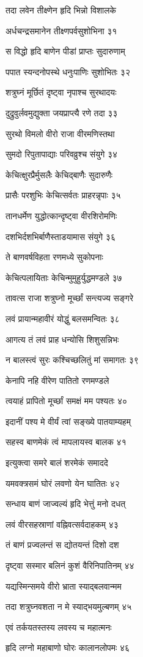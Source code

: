 तदा लवेन तीक्ष्णेन हृदि भिन्नो विशालके

अर्धचन्द्रसमानेन तीक्ष्णपर्वसुशोभिना ३१

स विद्धो हृदि बाणेन पीडां प्राप्तः सुदारुणाम्

पपात स्यन्दनोपस्थे धनुःपाणिः सुशोभितः ३२

शत्रुघ्नं मूर्छितं दृष्ट्वा नृपाश्च सुरथादयः

दुद्रुवुर्लवमुद्युक्ता जयप्राप्त्यै रणे तदा ३३

सुरथो विमलो वीरो राजा वीरमणिस्तथा

सुमदो रिपुतापाद्याः परिवव्रुश्च संयुगे ३४

केचित्क्षुरप्रैर्मुसलैः केचिद्बाणैः सुदारुणैः

प्रासैः परशुभिः केचित्सर्वतः प्राहरन्नृपाः ३५

तानधर्मेण युद्धोत्कान्दृष्ट्वा वीरशिरोमणिः

दशभिर्दशभिर्बाणैस्ताडयामास संयुगे ३६

ते बाणवर्षविहता रणमध्ये सुकोपनाः

केचित्पलायिताः केचिन्मुमुहुर्युद्धमण्डले ३७

तावत्स राजा शत्रुघ्नो मूर्च्छां सन्त्यज्य सङ्गरे

लवं प्रायान्महावीरं योद्धुं बलसमन्वितः ३८

आगत्य तं लवं प्राह धन्योसि शिशुसन्निभः

न बालस्त्वं सुरः कश्चिच्छलितुं मां समागतः ३९

केनापि नहि वीरेण पातितो रणमण्डले

त्वयाहं प्रापितो मूर्च्छां समक्षं मम पश्यतः ४०

इदानीं पश्य मे वीर्यं त्वां सङ्ख्ये पातयाम्यहम्

सहस्व बाणमेकं त्वं मापलायस्व बालक ४१

इत्युक्त्वा समरे बालं शरमेकं समाददे

यमवक्त्रसमं घोरं लवणो येन घातितः ४२

सन्धाय बाणं जाज्वल्यं हृदि भेत्तुं मनो दधत्

लवं वीरसहस्राणां वह्निवत्सर्वदाहकम् ४३

तं बाणं प्रज्वलन्तं स द्योतयन्तं दिशो दश

दृष्ट्वा सस्मार बलिनं कुशं वैरिनिपातिनम् ४४

यद्यस्मिन्समये वीरो भ्राता स्याद्बलवान्मम

तदा शत्रुघ्नवशता न मे स्याद्भयमुल्बणम् ४५

एवं तर्कयतस्तस्य लवस्य च महात्मनः

हृदि लग्नो महाबाणो घोरः कालानलोपमः ४६

